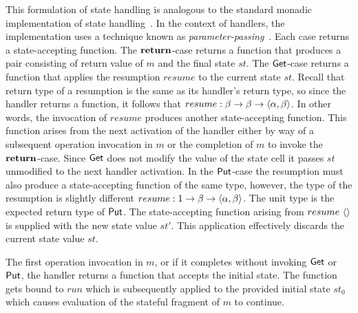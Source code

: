 \documentclass[12pt,phd,lfcs,twoside,openright,logo,leftchapter,normalheadings]{infthesis}
\theoremstyle{plain}
\theoremstyle{definition}
\begin{document}
This formulation of state handling is analogous to the standard
monadic implementation of state handling~\citep{Wadler95}. In the
context of handlers, the implementation uses a technique known as
\emph{parameter-passing}~\citep{PlotkinP09,Pretnar15}.
%
Each case returns a state-accepting function.
%
The $\mathbf{return}$-case returns a function that produces a pair consisting
of return value of $m$ and the final state $st$.
%
The $\mathsf{Get}$-case returns a function that applies the resumption
$resume$ to the current state $st$. Recall that return type of a
resumption is the same as its handler's return type, so since the
handler returns a function, it follows that
$resume : \beta \to \beta \to \langle \alpha, \beta \rangle$. In other words,
the invocation of $resume$ produces another state-accepting
function. This function arises from the next activation of the handler
either by way of a subsequent operation invocation in $m$ or the
completion of $m$ to invoke the $\mathbf{return}$-case. Since $\mathsf{Get}$ does not
modify the value of the state cell it passes $st$ unmodified to the
next handler activation.
%
In the $\mathsf{Put}$-case the resumption must also produce a state-accepting
function of the same type, however, the type of the resumption is
slightly different
$resume : 1 \to \beta \to \langle \alpha, \beta \rangle$. The unit
type is the expected return type of $\mathsf{Put}$. The state-accepting
function arising from $resume~\langle  \rangle$ is supplied with the new state
value $st'$. This application effectively discards the current state
value $st$.

The first operation invocation in $m$, or if it completes without
invoking $\mathsf{Get}$ or $\mathsf{Put}$, the handler returns a function that accepts
the initial state. The function gets bound to $run$ which is
subsequently applied to the provided initial state $st_0$ which causes
evaluation of the stateful fragment of $m$ to continue.
%
\end{document}
